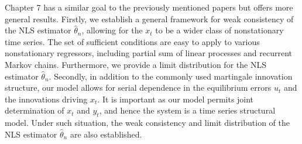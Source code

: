 Chapter 7 has a similar goal to the previously mentioned papers but offers more general results. Firstly, we establish a general framework for  weak consistency of the NLS estimator $\hat{\theta}_n$, allowing for the $x_t$ to be  a  wider class of nonstationary time series. The set of sufficient conditions are easy to apply to various nonstationary regressors, including partial sum of linear processes and recurrent Markov chains. Furthermore, we  provide a limit distribution for the NLS estimator $\hat{\theta}_n$. Secondly, in addition to the commonly used martingale innovation structure, our model allows for serial dependence in the equilibrium errors $u_t$ and the innovations driving $x_t$. It is important as our model  permits joint determination of $x_t$ and $y_t$, and hence the system is a time series structural model. Under such situation, the weak consistency and limit distribution of the NLS estimator $\hat{\theta}_n$ are also established.





